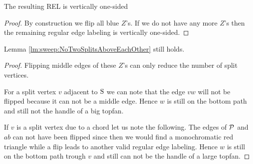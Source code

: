   \begin{lemma}
    \label{lm:sweep:vertOnsided}
    The resulting REL is vertically one-sided
  \end{lemma}
  \begin{proof}
    By construction we flip all blue $Z$'s. If we do not have any more $Z$'s then the remaining regular edge labeling is vertically one-sided. 
  \end{proof}

  \begin{lemma}
    \label{lm:sweep:NoTwoSplitsAboveEachOtherVertOnesided}
    Lemma \ref{lm:sweep:NoTwoSplitsAboveEachOther} still holds.
  \end{lemma}

  \begin{proof}
    Flipping middle edges of these $Z$'s  can only reduce the number of split vertices.

    For a split vertex $v$ adjacent to $\pS$ we can note that the edge $vw$ will not be flipped because it can not be a middle edge. Hence $w$ is still on the bottom path and still not the handle of a big topfan.

    If $v$ is a split vertex due to a chord let us note the following.
    The edges of $\P$ and $ab$ can not have been flipped since then we would find a monochromatic red triangle while a flip leads to another valid regular edge labeling. Hence $w$ is still on the bottom path trough $v$ and still can not be the handle of a large topfan.
  \end{proof}
